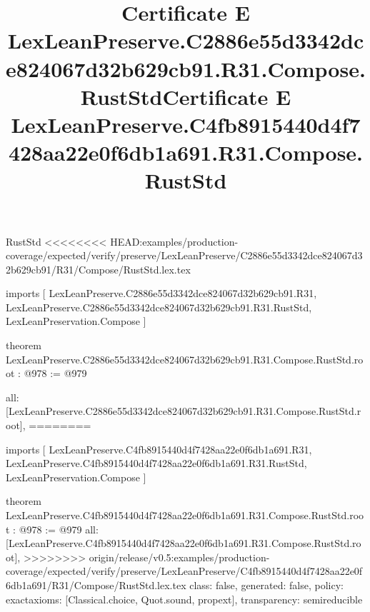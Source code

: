 \begin{lexlean}{RustStd}
<<<<<<<< HEAD:examples/production-coverage/expected/verify/preserve/LexLeanPreserve/C2886e55d3342dce824067d32b629cb91/R31/Compose/RustStd.lex.tex
\title{Certificate E LexLeanPreserve.C2886e55d3342dce824067d32b629cb91.R31.Compose.RustStd}
\begin{coremodule}
imports [
  LexLeanPreserve.C2886e55d3342dce824067d32b629cb91.R31,
  LexLeanPreserve.C2886e55d3342dce824067d32b629cb91.R31.RustStd,
  LexLeanPreservation.Compose
]

theorem LexLeanPreserve.C2886e55d3342dce824067d32b629cb91.R31.Compose.RustStd.root : @978 := @979 {
  all: [LexLeanPreserve.C2886e55d3342dce824067d32b629cb91.R31.Compose.RustStd.root],
========
\title{Certificate E LexLeanPreserve.C4fb8915440d4f7428aa22e0f6db1a691.R31.Compose.RustStd}
\begin{coremodule}
imports [
  LexLeanPreserve.C4fb8915440d4f7428aa22e0f6db1a691.R31,
  LexLeanPreserve.C4fb8915440d4f7428aa22e0f6db1a691.R31.RustStd,
  LexLeanPreservation.Compose
]

theorem LexLeanPreserve.C4fb8915440d4f7428aa22e0f6db1a691.R31.Compose.RustStd.root : @978 := @979 {
  all: [LexLeanPreserve.C4fb8915440d4f7428aa22e0f6db1a691.R31.Compose.RustStd.root],
>>>>>>>> origin/release/v0.5:examples/production-coverage/expected/verify/preserve/LexLeanPreserve/C4fb8915440d4f7428aa22e0f6db1a691/R31/Compose/RustStd.lex.tex
  class: false,
  generated: false,
  policy: exact{axioms: [Classical.choice, Quot.sound, propext]},
  transparency: semireducible
}


\end{coremodule}}
\end{coremodule}
\end{lexlean}

